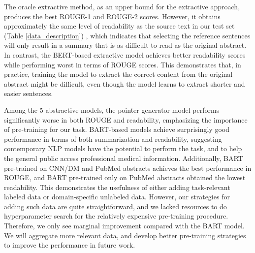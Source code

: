 \documentclass[letterpaper, table]{article} %
\begin{document}
The oracle extractive method, as an upper bound for the extractive approach, produces the best ROUGE-1 and ROUGE-2 scores. However, it obtains approximately the same level of readability as the source text in our test set (Table \ref{data_description})
, which indicates that selecting the reference sentences will only result in a summary that is as difficult to read as the original abstract.
In contrast, the BERT-based extractive model achieves better readability scores while performing worst in terms of ROUGE scores. This demonstrates that, in practice, training the model to extract the correct content from the original abstract might be difficult, even though the model learns to extract shorter and easier sentences.

Among the 5 abstractive models, the pointer-generator model performs significantly worse in both ROUGE and readability, emphasizing the importance of pre-training for our task.
BART-based models achieve surprisingly good performance in terms of both summarization and readability, suggesting contemporary NLP models have the potential to perform the task, and to help the general public access professional medical information. Additionally, BART pre-trained on CNN/DM and PubMed abstracts achieves the best performance in ROUGE, and BART pre-trained only on PubMed abstracts obtained the lowest readability. 
This demonstrates the usefulness of either adding task-relevant labeled data or domain-specific unlabeled data. However, our strategies for adding such data are quite straightforward, and we lacked resources to do hyperparameter search for the relatively expensive pre-training procedure. Therefore, we only see marginal improvement compared with the BART model. We will aggregate more relevant data, and develop better pre-training strategies to improve the performance in future work.
\end{document}
